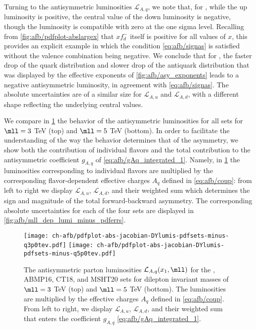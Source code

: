 Turning to the antisymmetric \pdf luminosities $\mathcal{L}_{A,q}$,
we note  that, for , while the up luminosity is
positive, the central value of the down luminosity is negative, though
the luminosity is compatible with zero at the one sigma level.
%
Recalling
from \cref{fig:afb/pdfplot-abslargex} that $xf_{d}^-$ itself is
positive for all values of $x$,  this provides an explicit example in
which the condition \cref{eq:afb/signas} is satisfied without the valence
combination being negative.
%
We conclude that for , the faster
drop of the quark distribution and slower drop of the antiquark
distribution that was displayed by the effective exponents of
\cref{fig:afb/asy_exponents} leads to a negative antisymmetric
luminosity, in agreement with \cref{eq:afb/signas}.
The absolute \pdf uncertainties are of a similar size for
$\mathcal{L}_{A,u}$ and $\mathcal{L}_{A,d}$, with a different shape
reflecting the underlying central values.

We compare
in \cref{fig:afb/mll_dep_lumi_minus}
the behavior of the antisymmetric luminosities for all \pdf
sets for $\mll=3$ TeV (top) and $\mll=5$ TeV (bottom).
%
In order to facilitate the understanding of the way the \pdf behavior
determines that of the asymmetry, we show both the contribution of
individual flavors and the total contribution
to the antisymmetric coefficient $g_{A,q}$ of
\cref{eq:afb/gAq_integrated_1}. Namely, in
\cref{fig:afb/mll_dep_lumi_minus} the luminosities corresponding to
individual flavors are multiplied by the corresponding flavor-dependent
effective charges $A_q$ defined in \cref{eq:afb/coup}:
from left to right we display $\mathcal{L}_{A,u}$,  $\mathcal{L}_{A,d}$,
and their weighted sum
 which determines
the sign and magnitude of the total forward-backward asymmetry.
%
The corresponding absolute \pdf uncertainties for each of the four \pdf sets
are displayed in  \cref{fig:afb/mll_dep_lumi_minus_pdferrs}.

\begin{figure}[!t]
 \centering
 \texttt{[image: ch-afb/pdfplot-abs-jacobian-DYlumis-pdfsets-minus-q3p0tev.pdf]}
 \texttt{[image: ch-afb/pdfplot-abs-jacobian-DYlumis-pdfsets-minus-q5p0tev.pdf]}
 \caption{The antisymmetric 
   parton luminosities $\mathcal{L}_{A,q}(x_1,\mll)$ for the , ABMP16,
   CT18, and MSHT20 \nnlo \pdf sets for dilepton
   invariant masses of
   $\mll=3$ TeV (top) and $\mll=5$ TeV (bottom).
   The luminosities are multiplied by the effective charges
   $A_q$ defined in \cref{eq:afb/coup}.
   From left to right, we display $\mathcal{L}_{A,u}$,  $\mathcal{L}_{A,d}$,
   and their weighted sum that enters the  coefficient $g_{A,q}$ \cref{eq:afb/gAq_integrated_1}.
    }    
 \label{fig:afb/mll_dep_lumi_minus}
\end{figure}

